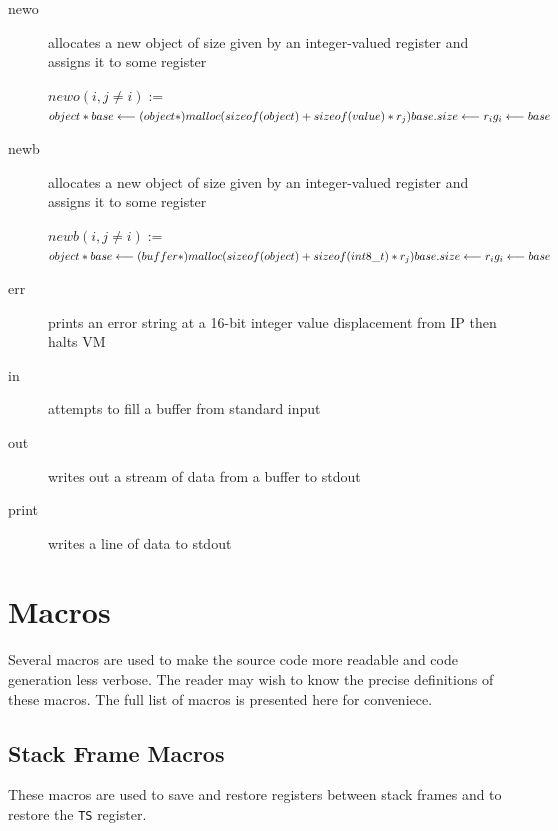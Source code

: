 \documentclass[english,a4paper,12pt]{report}
\begin{document}
\begin{description}
	\item[newo] allocates a new object of size given by an 
	integer-valued
	register and assigns it to some register
	
	$ newo(i, j \neq i) := $ \\
	$  object *base \longleftarrow (object*)malloc(sizeof(object) + 
	sizeof(value)* r_j) \\
	base.size \longleftarrow r_i\\
	g_i \longleftarrow base \\ $
	
	\item[newb]{} allocates a new object of size given by an
	integer-valued register and assigns it to some register
	
	$ newb(i, j \neq i) := $ \\
	$  object *base \longleftarrow (buffer*)malloc(sizeof(object) + 
	sizeof(int8\_t)* r_j) \\
	base.size \longleftarrow r_i\\
	g_i \longleftarrow base \\ $
	
	\item[err] prints an error string at a 16-bit integer value
	displacement from IP then halts VM
	
	
	\item[in] attempts to fill a buffer from standard input
	
	\item[out] writes out a stream of data from a buffer to stdout
	
	\item[print] writes a line of data to stdout
	
\end{description}
\chapter{Macros}

Several macros are used to make the source code more readable and code
generation less verbose. The reader may wish to know the precise
definitions of these macros. The full list of macros is presented here
for conveniece.

\section{Stack Frame Macros}
\label{sec:stackframemacros}
These macros are used to save and restore registers between stack
frames and to restore the \verb|TS| register.
\end{document}
